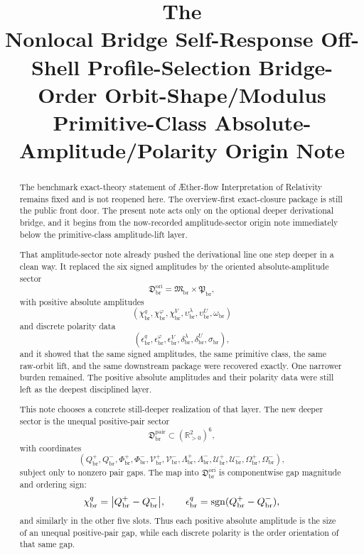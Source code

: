 \documentclass[11pt]{article}
\title{\textbf{The \TheoryName{}}\\[0.4em]
\large Nonlocal Bridge Self-Response Off-Shell Profile-Selection Bridge-Order Orbit-Shape/Modulus Primitive-Class Absolute-Amplitude/Polarity Origin Note}
\author{}
\date{}
\newcommand{\Aflow}{\AE{}ther-flow}
\newcommand{\TheoryName}{\Aflow{} Interpretation of Relativity}
\newcommand{\OriginSector}{\mathfrak D_{\mathrm{br}}^{\mathrm{ori}}}
\newcommand{\AbsAmpSector}{\mathfrak M_{\mathrm{br}}}
\newcommand{\PolaritySector}{\mathfrak P_{\mathrm{br}}}
\newcommand{\AbsReadAmp}{\chi_{\mathrm{br}}^{q}}
\newcommand{\AbsCovAmp}{\chi_{\mathrm{br}}^{\varphi}}
\newcommand{\AbsRelaxAmp}{\chi_{\mathrm{br}}^{V}}
\newcommand{\AbsWellAmp}{\upsilon_{\mathrm{br}}^{\lambda}}
\newcommand{\AbsEqAmp}{\upsilon_{\mathrm{br}}^{U}}
\newcommand{\AbsScaleAmp}{\omega_{\mathrm{br}}}
\newcommand{\PolRead}{\epsilon_{\mathrm{br}}^{q}}
\newcommand{\PolCov}{\epsilon_{\mathrm{br}}^{\varphi}}
\newcommand{\PolRelax}{\epsilon_{\mathrm{br}}^{V}}
\newcommand{\PolWell}{\delta_{\mathrm{br}}^{\lambda}}
\newcommand{\PolEq}{\delta_{\mathrm{br}}^{U}}
\newcommand{\PolScale}{\sigma_{\mathrm{br}}}
\newcommand{\PairSector}{\mathfrak D_{\mathrm{br}}^{\mathrm{pair}}}
\newcommand{\PairReadPlus}{Q_{\mathrm{br}}^{+}}
\newcommand{\PairReadMinus}{Q_{\mathrm{br}}^{-}}
\newcommand{\PairCovPlus}{\Phi_{\mathrm{br}}^{+}}
\newcommand{\PairCovMinus}{\Phi_{\mathrm{br}}^{-}}
\newcommand{\PairRelaxPlus}{\mathcal V_{\mathrm{br}}^{+}}
\newcommand{\PairRelaxMinus}{\mathcal V_{\mathrm{br}}^{-}}
\newcommand{\PairWellPlus}{\Lambda_{\mathrm{br}}^{+}}
\newcommand{\PairWellMinus}{\Lambda_{\mathrm{br}}^{-}}
\newcommand{\PairEqPlus}{\mathcal U_{\mathrm{br}}^{+}}
\newcommand{\PairEqMinus}{\mathcal U_{\mathrm{br}}^{-}}
\newcommand{\PairScalePlus}{\Omega_{\mathrm{br}}^{+}}
\newcommand{\PairScaleMinus}{\Omega_{\mathrm{br}}^{-}}
\begin{document}
\maketitle

\begin{abstract}
The benchmark exact-theory statement of \TheoryName{} remains fixed and is not reopened here. The overview-first exact-closure package is still the public front door. The present note acts only on the optional deeper derivational bridge, and it begins from the now-recorded amplitude-sector origin note immediately below the primitive-class amplitude-lift layer.

That amplitude-sector note already pushed the derivational line one step deeper in a clean way. It replaced the six signed amplitudes by the oriented absolute-amplitude sector
\[
\OriginSector
=
\AbsAmpSector\times\PolaritySector,
\]
with positive absolute amplitudes
\[
(\AbsReadAmp,\AbsCovAmp,\AbsRelaxAmp,\AbsWellAmp,\AbsEqAmp,\AbsScaleAmp)
\]
and discrete polarity data
\[
(\PolRead,\PolCov,\PolRelax,\PolWell,\PolEq,\PolScale),
\]
and it showed that the same signed amplitudes, the same primitive class, the same raw-orbit lift, and the same downstream package were recovered exactly. One narrower burden remained. The positive absolute amplitudes and their polarity data were still left as the deepest disciplined layer.

This note chooses a concrete still-deeper realization of that layer. The new deeper sector is the unequal positive-pair sector
\[
\PairSector\subset(\mathbb R_{>0}^{2})^{6},
\]
with coordinates
\[
(\PairReadPlus,\PairReadMinus,\PairCovPlus,\PairCovMinus,\PairRelaxPlus,\PairRelaxMinus,
\PairWellPlus,\PairWellMinus,\PairEqPlus,\PairEqMinus,\PairScalePlus,\PairScaleMinus),
\]
subject only to nonzero pair gaps. The map into \(\OriginSector\) is componentwise gap magnitude and ordering sign:
\[
\AbsReadAmp=\abs{\PairReadPlus-\PairReadMinus},
\qquad
\PolRead=\operatorname{sgn}(\PairReadPlus-\PairReadMinus),
\]
and similarly in the other five slots. Thus each positive absolute amplitude is the size of an unequal positive-pair gap, while each discrete polarity is the order orientation of that same gap.


\end{abstract}
\end{document}
